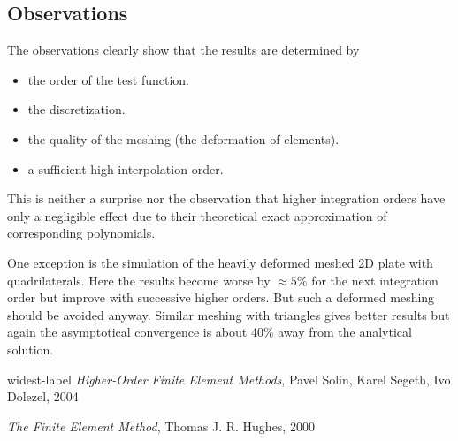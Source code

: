 \documentclass[a4paper,10pt]{article}
\begin{document}
\subsection{Observations}
The observations clearly show that the results are determined by
\begin{itemize}
\item the order of the test function.
\item the discretization.
\item the quality of the meshing (the deformation of elements).
\item a sufficient high interpolation order.
\end{itemize}
This is neither a surprise nor the observation that higher integration orders have 
only a negligible effect due to their theoretical exact approximation of corresponding 	polynomials.

One exception is the simulation of the heavily deformed meshed 2D plate with quadrilaterals. Here the results become worse by $\approx 5 \%$ for the next integration order but improve with successive higher orders. But such a  deformed meshing should be avoided anyway. Similar meshing with triangles gives better results but again the asymptotical convergence is about 40\% away from the analytical solution. 

\begin{thebibliography}{widest-label}
 \emph{Higher-Order Finite Element Methods},
  Pavel Solin, Karel Segeth, Ivo Dolezel, 2004

 \emph{The Finite Element Method},
  Thomas J. R. Hughes, 2000

\end{thebibliography}
\end{document}
